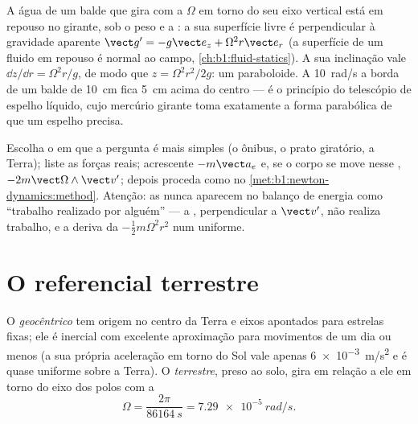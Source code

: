 \begin{example}\label{ex:b1:non-inertial-frames:bucket}
A água de um balde que gira com a  $\Omega$ em torno do
seu eixo vertical está em repouso no  girante, sob o peso e a
: a sua superfície livre é perpendicular à gravidade
aparente $\vect g' = -g\vect e_z +
\Omega^2r\vect e_r$ (a superfície de um fluido em repouso é normal ao campo,
\cref{ch:b1:fluid-statics}). A sua inclinação vale $\dd z/\dd r = \Omega^2r/g$,
de modo que $z = \Omega^2r^2/2g$: um paraboloide. A \qty{10}{rad/s} a borda
de um balde de \qty{10}{cm} fica \qty{5}{cm} acima do centro --- é o
princípio do telescópio de espelho líquido, cujo mercúrio girante toma
exatamente a forma parabólica de que um espelho precisa.
\end{example}

\begin{method}\label{met:b1:non-inertial-frames:method}
Escolha o  em que a pergunta é mais simples (o ônibus, o prato
giratório, a Terra); liste as forças reais; acrescente $-m\vect a_e$ e, se o
corpo se move nesse , $-2m\vect\Omega\wedge\vect v'$; depois
proceda como no \cref{met:b1:newton-dynamics:method}. Atenção: as  nunca aparecem no balanço de energia como ``trabalho realizado por
alguém'' --- a , perpendicular a $\vect v'$, não realiza
trabalho, e a  deriva da 
$-\tfrac12 m\Omega^2r^2$ num  uniforme.
\end{method}

\section{O referencial terrestre}

\begin{definition}\label{def:b1:non-inertial-frames:earth}
O \emph{ geocêntrico} tem origem no centro da Terra e eixos
apontados para estrelas fixas; ele é inercial com excelente aproximação
para movimentos de um dia ou menos (a sua própria aceleração em torno do
Sol vale apenas \qty{6e-3}{m/s^2} e é quase uniforme sobre a Terra).
O \emph{ terrestre}, preso ao solo, gira em relação a ele em
torno do eixo dos polos com a 
\[
\Omega = \frac{2\pi}{\qty{86164}{s}} = \qty{7.29e-5}{rad/s} .
\]
\end{definition}

